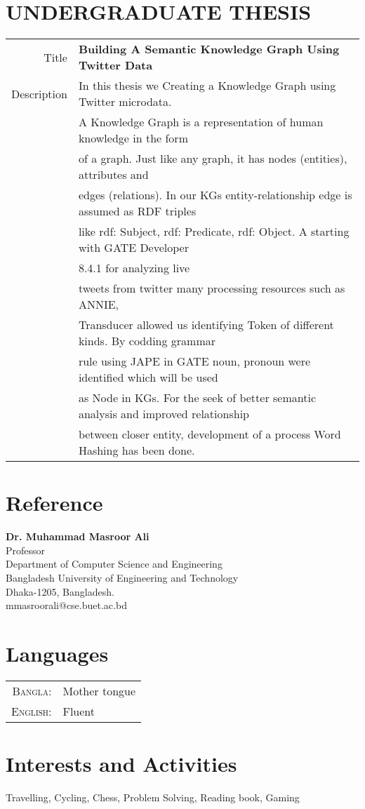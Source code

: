 \documentclass[a4paper,10pt]{article}
\begin{document}
\section{UNDERGRADUATE THESIS}
\begin{tabular}{rl}
Title &  \textbf{Building A Semantic Knowledge Graph Using Twitter Data}\\
Description & In this thesis we Creating a Knowledge Graph using Twitter microdata. \\
& A Knowledge Graph is a representation of human knowledge in the form \\
& of a graph. Just like any graph, it has nodes (entities), attributes and \\
& edges (relations). In our KGs entity-relationship edge is assumed as RDF triples \\
&  like rdf: Subject, rdf: Predicate, rdf: Object. A starting with GATE Developer \\
& 8.4.1 for analyzing live \\
& tweets from twitter many processing resources such as ANNIE,\\
&  Transducer allowed us identifying Token of different kinds. By codding grammar \\
& rule using JAPE in GATE noun, pronoun were identified which will be used\\
&  as Node in KGs. For the seek of better semantic analysis and improved relationship\\
&  between closer entity, development of a process Word Hashing has been done. \\
\end{tabular}



\section{Reference}
\textbf{Dr. Muhammad Masroor Ali} \\
Professor\\
Department of Computer Science and Engineering\\
Bangladesh University of Engineering and Technology\\
Dhaka-1205, Bangladesh.\\
mmasroorali@cse.buet.ac.bd
\section{Languages}
\begin{tabular}{rl}
\textsc{Bangla:}&Mother tongue\\
\textsc{English:}&Fluent\\
\end{tabular}

\section{Interests and Activities}
 Travelling, Cycling, Chess, Problem Solving, Reading book, Gaming\\
\end{document}
